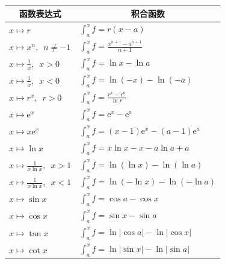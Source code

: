 \documentclass[12pt,UTF8]{ctexbook}
\theoremstyle{definition}
\theoremstyle{plain}
\begin{document}
\begin{appendix}
\begin{center}
    \renewcommand{\arraystretch}{2}
    \setlength{\extrarowheight}{-3pt}
    \begin{longtable}{|l|l|}
        \hline \multicolumn{1}{|c|}{\textbf{函数表达式}} & \multicolumn{1}{c|}{\textbf{积合函数}} \\[4pt] 
        \hline    
        $\displaystyle x\mapsto r$ & $\displaystyle \int_a^x f = r(x - a)$ \\[4pt]
        \hline    
        $\displaystyle x\mapsto x^n,\,\,\,n\neq -1$ & $\displaystyle \int_a^x f = \frac{x^{n+1} - a^{n+1}}{n+1}$ \\[4pt]
        \hline    
        $\displaystyle x\mapsto \frac{1}{x}, \,\,\, x > 0$ & $\displaystyle \int_a^x f = \ln{x} - \ln{a}$ \\[4pt]
        \hline    
        $\displaystyle x\mapsto \frac{1}{x}, \,\,\, x < 0$ & $\displaystyle \int_a^x f = \ln{(-x)} - \ln{(-a)}$ \\[4pt]
        \hline
        $\displaystyle x\mapsto r^x,\,\,\, r>0$ & $\displaystyle \int_a^x f = \frac{r^x - r^a}{\ln{r}}$ \\[4pt]
        \hline
        $\displaystyle x\mapsto \mathrm{e}^x$ & $\displaystyle \int_a^x f = \mathrm{e}^x - \mathrm{e}^a$ \\[4pt]
        \hline    
        $\displaystyle x\mapsto x\mathrm{e}^x$ & $\displaystyle \int_a^x f = (x - 1)\mathrm{e}^x - (a - 1)\mathrm{e}^a$ \\[4pt]
        \hline
        $\displaystyle x\mapsto \ln{x}$ & $\displaystyle \int_a^x f = x\ln{x} - x - a\ln{a} + a$ \\[4pt]
        \hline
        $\displaystyle x\mapsto \frac{1}{x\ln{x}},\,\,\, x>1$ & $\displaystyle \int_a^x f = \ln{(\ln{x})} - \ln{(\ln{a})}$ \\[4pt]
        \hline
        $\displaystyle x\mapsto \frac{1}{x\ln{x}},\,\,\, x<1$ & $\displaystyle \int_a^x f = \ln{(-\ln{x})} - \ln{(-\ln{a})}$ \\[4pt]
        \hline    
        $\displaystyle x\mapsto \sin{x}$ & $\displaystyle \int_a^x f = \cos{a} - \cos{x}$ \\[4pt]
        \hline    
        $\displaystyle x\mapsto \cos{x}$ & $\displaystyle \int_a^x f = \sin{x} - \sin{a}$ \\[4pt]
        \hline    
        $\displaystyle x\mapsto \tan{x}$ & $\displaystyle \int_a^x f = \ln{|\cos{a}|} - \ln{|\cos{x}|}$ \\[4pt]
        \hline    
        $\displaystyle x\mapsto \cot{x}$ & $\displaystyle \int_a^x f = \ln{|\sin{x}|} - \ln{|\sin{a}|}$ \\[4pt]

\end{longtable}
\end{center}
\end{appendix}
\end{document}
